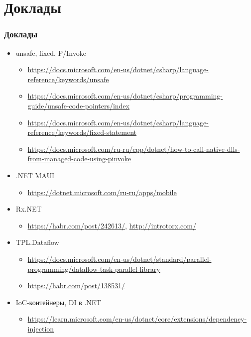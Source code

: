 \documentclass{../../slides-style}
\begin{document}
    \begin{frame}[plain]
        \titlepage
    \end{frame}

    \section{Доклады}

    \begin{frame}
        \frametitle{Доклады}
        \begin{itemize}
            \item unsafe, fixed, P/Invoke
            \begin{itemize}
                \footnotesize
                \item \url{https://docs.microsoft.com/en-us/dotnet/csharp/language-reference/keywords/unsafe}
                \item \url{https://docs.microsoft.com/en-us/dotnet/csharp/programming-guide/unsafe-code-pointers/index}
                \item \url{https://docs.microsoft.com/en-us/dotnet/csharp/language-reference/keywords/fixed-statement}
                \item \url{https://docs.microsoft.com/ru-ru/cpp/dotnet/how-to-call-native-dlls-from-managed-code-using-pinvoke}
            \end{itemize}
            \item .NET MAUI
            \begin{itemize}
                \footnotesize
                \item \url{https://dotnet.microsoft.com/ru-ru/apps/mobile}
            \end{itemize}
            \item Rx.NET
            \begin{itemize}
                \footnotesize
                \item \url{https://habr.com/post/242613/}, \url{http://introtorx.com/}
            \end{itemize}
            \item TPL.Dataflow
            \begin{itemize}
                \footnotesize
                \item \url{https://docs.microsoft.com/en-us/dotnet/standard/parallel-programming/dataflow-task-parallel-library}
                \item \url{https://habr.com/post/138531/}
            \end{itemize}
            \item IoC-контейнеры, DI в .NET
            \begin{itemize}
                \footnotesize
                \item \url{https://learn.microsoft.com/en-us/dotnet/core/extensions/dependency-injection}
            \end{itemize}
        \end{itemize}
    \end{frame}
\end{document}
